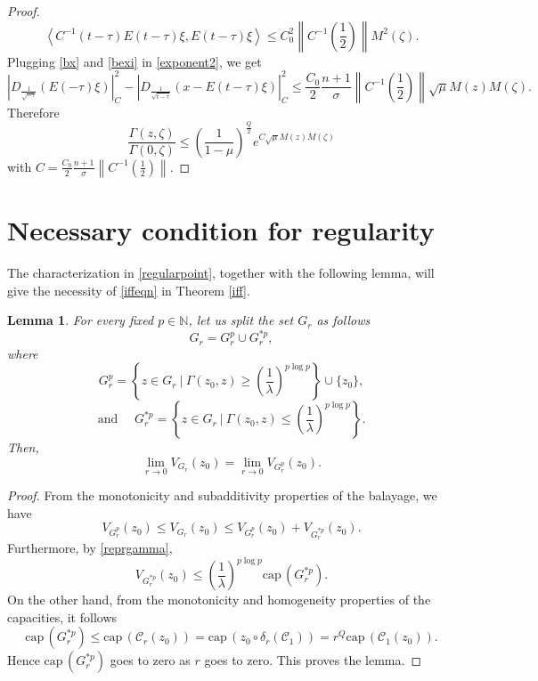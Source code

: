\documentclass[10pt]{amsart}
\def \C {{\mathcal{C}}}
\newcommand{\ttende}{\longrightarrow}
\newcommand{\enne} {\mathbb{N}}
\newtheorem{lemma}[theorem]{Lemma}
\numberwithin{equation}{section}
\begin{document}
\begin{proof}
\begin{equation}\label{bexi}
\left\langle C^{-1}(t-\tau)E(t-\tau)\xi,E(t-\tau)\xi\right\rangle\leq C_0^2 \left\|C^{-1}\left(\frac{1}{2}\right)\right\|M^2(\zeta).
\end{equation}
Plugging \eqref{bx} and \eqref{bexi} in \eqref{exponent2}, we get
$$\left|D_{\frac{1}{\sqrt{-\tau}}}\left(E(-\tau)\xi\right)\right|_C^2-\left|D_{\frac{1}{\sqrt{t-\tau}}}\left(x-E(t-\tau)\xi\right) \right|_C^2 \leq\frac{C_0}{2}\frac{n+1}{\sigma}\left\|C^{-1}\left(\frac{1}{2}\right)\right\|\sqrt{\mu}M(z)M(\zeta).$$
Therefore
$$\frac{\Gamma(z,\zeta)}{\Gamma(0,\zeta)}\leq\left(\frac{1}{1-\mu}\right)^{\frac{Q}{2}}e^{C\sqrt{\mu}M(z)M(\zeta)}$$
with $C=\frac{C_0}{2}\frac{n+1}{\sigma}\left\|C^{-1}\left(\frac{1}{2}\right)\right\|$.
\end{proof}





\section{Necessary condition for regularity}\label{necessity} 

The characterization in \eqref{regularpoint}, together with the following lemma, will give the necessity of \eqref{iffeqn} in Theorem \ref{iff}.
\begin{lemma}\label{lochiamiamolemma?} 
For every fixed $p\in\enne$, let us split the set $G_r$ as follows
$$G_r=G_r^p\cup G_r^{*p},$$
where
$$G_r^p=\left\{ z\in G_r \  | \  \Gamma(z_0,z) \geq \left( \frac{1}{\lambda} \right)^{p \log p } \right\}\cup\{z_0\},$$
$$\mbox{and }\quad G_r^{*p}=\left\{ z\in G_r \  | \  \Gamma(z_0,z) \le \left( \frac{1}{\lambda} \right)^{p \log p } \right\}.$$
Then, 
$$\lim_{r\ttende 0} V_{G_r}(z_0)= \lim_{r\ttende 0} V_{G_r^{p}}(z_0).$$
\end{lemma} 
\begin{proof} From the monotonicity and subadditivity properties of the balayage, we have 
$$V_{G_r^{p}}(z_0) \le V_{G_r}(z_0)\le V_{G_r^{p}}(z_0) + V_{G_r^{*p}}(z_0).$$
Furthermore, by \eqref{reprgamma},
$$V_{G_r^{*p}}(z_0)\le \left(\frac{1}{\lambda}\right)^{p \log p} \!\!\!  \!\!\! \mathrm{cap\, } ({G^{*p}_r}).$$
On the other hand, from the monotonicity and homogeneity properties of the capacities, it follows 
$$\mathrm{cap\, } ({G^{*p}_r})  \le  \mathrm{cap\, } ({\C_r}(z_0)) =  \mathrm{cap\, } (z_0\circ \delta_r (\C_1)) = r^Q  \mathrm{cap\, } ({\C_1}(z_0)). $$
Hence $\mathrm{cap\, } ({G^{*p}_r})$ goes to zero as $r$  goes to zero. This proves the lemma.
\end{proof}
\end{document}
